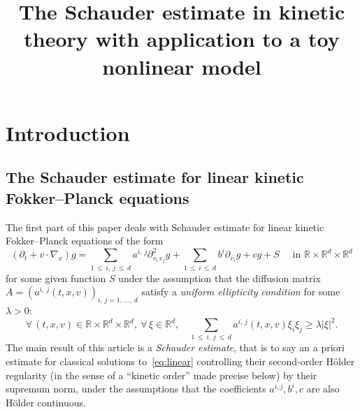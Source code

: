 \documentclass[AHL,Unicode,longabstracts,published]{cedram}
\title[The Schauder estimate in kinetic theory and application]{The Schauder estimate in kinetic theory with application to a toy nonlinear model}
\author[\initial{C.} \lastname{Imbert}]{\firstname{Cyril}
\lastname{Imbert}}
\author[\initial{C.} \lastname{Mouhot}]{\firstname{Clément}
\lastname{Mouhot}}
\newcommand{\R}{\mathbb{R}}
\let\oldforall\forall
\renewcommand*{\forall}{\mathrel{\oldforall}}
\begin{document}
\maketitle

\section{Introduction}

\subsection{The Schauder estimate for linear kinetic Fokker--Planck equations}

The first part of this paper deals with Schauder estimate for linear kinetic Fokker--Planck equations of the form
\begin{equation}\label{eq:linear}
\left(\partial_t + v \cdot \nabla_x\right) g =
\sum_{1\,\le\:i,\,j\:\le\,d} a^{i,\,j} \partial^2_{v_i\,v_j} g + \sum_{1\,\le\,i\,\le\,d}b^i \partial_{v_i} g + c g + S \quad \text{ in } \R \times \R^d \times \R^d
\end{equation}
for some given function $S$ under the assumption that the diffusion matrix\linebreak$A= (a^{i,\,j}(t,x,v))_{i,\,j=1,\,\dots,\,d}$ satisfy a \emph{uniform ellipticity condition} for some $\lambda>0$:
\begin{equation}\label{eq:elliptic}
\forall \, (t,x,v) \in \R \times \R^d \times \R^d, \
\forall \, \xi \in \R^d, \quad
\sum_{1\,\le\:i,\,j\:\le\,d} a^{i,\,j}(t,x,v) \xi_i \xi_j \ge \lambda |\xi|^2.
\end{equation}
The main result of this article is a \emph{Schauder estimate}, that is to say an a priori estimate for classical solutions to~\eqref{eq:linear} controlling their second-order H\"older regularity (in the sense of a ``kinetic order'' made precise below) by their supremum norm, under the assumptions that the coefficients $a^{i,j},b^i,c$ are also H\"older continuous.
\end{document}
